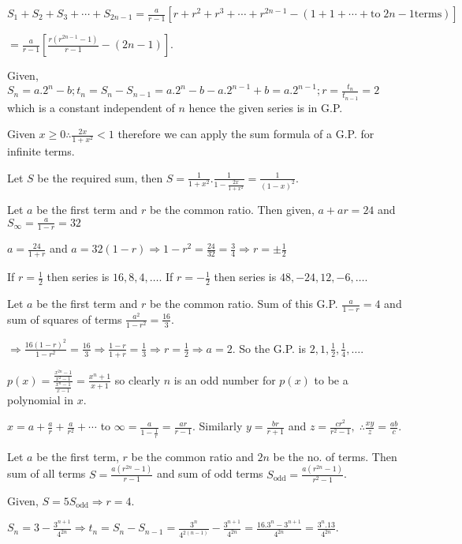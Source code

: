   $S_1 + S_2 + S_3 + \cdots + S_{2n - 1} = \frac{a}{r - 1}\left[r + r^2 + r^3 + \cdots + r^{2n - 1} -(1 + 1
    + \cdots + \mathrm{to}\;2n - 1 \mathrm{terms})\right]$

  $= \frac{a}{r - 1}\left[\frac{r(r^{2n - 1} - 1)}{r - 1} - (2n - 1)\right]$.
\item Given, $S_n = a.2^n - b; t_n = S_n - S_{n- 1} = a.2^n - b - a.2^{n - 1} + b = a.2^{n - 1}; r =
  \frac{t_n}{t_{n - 1}} = 2$ which is a constant independent of $n$ hence the given series is in G.P.
\item Given $x\geq 0 \therefore \frac{2x}{1 + x^2} < 1$ therefore we can apply the sum formula of a G.P. for
  infinite terms.

  Let $S$ be the required sum, then $S = \frac{1}{1 + x^2}.\frac{1}{1 - \frac{2x}{1 + x^2}} = \frac{1}{(1 -
    x)^2}$.
\item Let $a$ be the first term and $r$ be the common ratio. Then given, $a + ar = 24$ and $S_\infty =
  \frac{a}{1 - r} = 32$

  $a = \frac{24}{1 + r}$ and $a = 32(1 - r) \Rightarrow 1 - r^2 = \frac{24}{32} = \frac{3}{4} \Rightarrow r
  = \pm \frac{1}{2}$

  If $r = \frac{1}{2}$ then series is $16, 8, 4, \ldots$. If $r = -\frac{1}{2}$ then series is $48, -24, 12,
  -6, \ldots$.
\item Let $a$ be the first term and $r$ be the common ratio. Sum of this G.P. $\frac{a}{1 - r} = 4$ and sum
  of squares of terms $\frac{a^2}{1 - r^2} = \frac{16}{3}$.

  $\Rightarrow \frac{16(1 - r)^2}{1 - r^2} = \frac{16}{3}\Rightarrow \frac{1 - r}{1 + r} = \frac{1}{3}
  \Rightarrow r = \frac{1}{2} \Rightarrow a = 2$. So the G.P. is $2, 1, \frac{1}{2}, \frac{1}{4}, \ldots$.
\item $p(x) = \tfrac{\tfrac{x^{2n} - 1}{x^2 - 1}}{\tfrac{x^n - 1}{x - 1}} = \frac{x^n + 1}{x + 1}$ so clearly
  $n$ is an odd number for $p(x)$ to be a polynomial in $x$.
\item $x = a + \frac{a}{r} + \frac{a}{r^2} + \cdots$ to $\infty = \frac{a}{1 - \frac{1}{r}} = \frac{ar}{r -
  1}$. Similarly $y = \frac{br}{r + 1}$ and $z = \frac{cr^2}{r^2 - 1},\;\therefore \frac{xy}{z} =
  \frac{ab}{c}$.
\item Let $a$ be the first term, $r$ be the common ratio and $2n$ be the no. of terms. Then sum of all terms
  $S = \frac{a(r^{2n} - 1)}{r - 1}$ and sum of odd terms $S_{\mathrm{odd}} = \frac{a(r^{2n} - 1)}{r^2 - 1}$.

  Given, $S = 5S_{\mathrm{odd}}\Rightarrow r = 4$.
\item $S_n = 3 - \frac{3^{n + 1}}{4^{2n}} \Rightarrow t_n = S_n - S_{n - 1} = \frac{3^n}{4^{2(n - 1)}} -
  \frac{3^{n + 1}}{4^{2n}} = \frac{16.3^n - 3^{n + 1}}{4^{2n}} = \frac{3^n.13}{4^{2n}}$.

